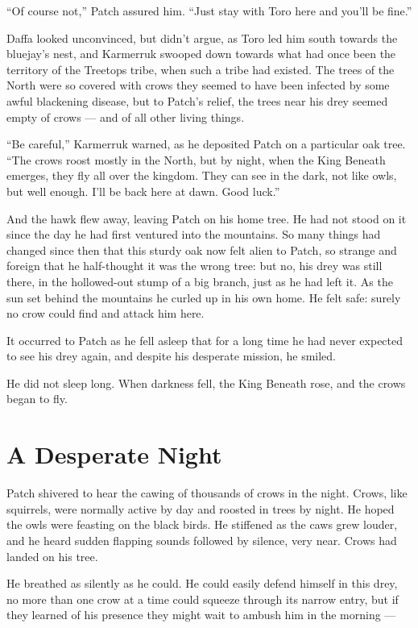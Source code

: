 \documentclass[12pt]{memoir}
\begin{document}
“Of course not,” Patch assured him. “Just stay with Toro here and
you’ll be fine.”

Daffa looked unconvinced, but didn’t argue, as Toro led him south
towards the bluejay’s nest, and Karmerruk swooped down towards what
had once been the territory of the Treetops tribe, when such a tribe
had existed. The trees of the North were so covered with crows they
seemed to have been infected by some awful blackening disease, but to
Patch’s relief, the trees near his drey seemed empty of crows — and of
all other living things.

“Be careful,” Karmerruk warned, as he deposited Patch on a particular
oak tree. “The crows roost mostly in the North, but by night, when the
King Beneath emerges, they fly all over the kingdom. They can see in
the dark, not like owls, but well enough. I’ll be back here at
dawn. Good luck.”

And the hawk flew away, leaving Patch on his home tree. He had not
stood on it since the day he had first ventured into the mountains. So
many things had changed since then that this sturdy oak now felt alien
to Patch, so strange and foreign that he half-thought it was the wrong
tree: but no, his drey was still there, in the hollowed-out stump of a
big branch, just as he had left it. As the sun set behind the
mountains he curled up in his own home. He felt safe: surely no crow
could find and attack him here.

It occurred to Patch as he fell asleep that for a long time he had
never expected to see his drey again, and despite his desperate
mission, he smiled.

He did not sleep long. When darkness fell, the King Beneath rose, and
the crows began to fly.


\section{A Desperate Night}

Patch shivered to hear the cawing of thousands of crows in the
night. Crows, like squirrels, were normally active by day and roosted
in trees by night. He hoped the owls were feasting on the black
birds. He stiffened as the caws grew louder, and he heard sudden
flapping sounds followed by silence, very near. Crows had landed on
his tree.

He breathed as silently as he could. He could easily defend himself in
this drey, no more than one crow at a time could squeeze through its
narrow entry, but if they learned of his presence they might wait to
ambush him in the morning —
\end{document}
